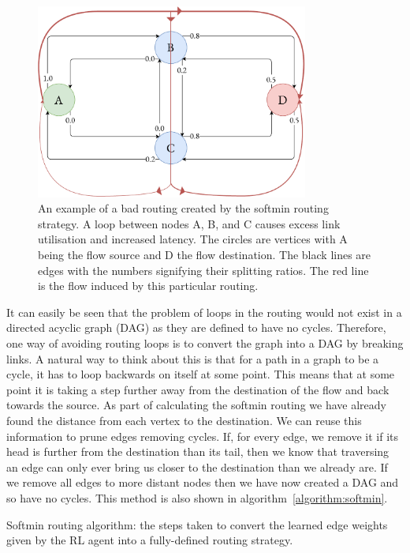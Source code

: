 \begin{figure}
    \centering
    \includegraphics[width=0.8\textwidth]{figures/bad_route.pdf}
    \caption{An example of a bad routing created by the softmin routing strategy. A loop between nodes A, B, and C causes excess link utilisation and increased latency. The circles are vertices with A being the flow source and D the flow destination. The black lines are edges with the numbers signifying their splitting ratios. The red line is the flow induced by this particular routing.}
    \label{fig:bad_route}
\end{figure}


It can easily be seen that the problem of loops in the routing would not exist in a directed acyclic graph (DAG) as they are defined to have no cycles. Therefore, one way of avoiding routing loops is to convert the graph into a DAG by breaking links. A natural way to think about this is that for a path in a graph to be a cycle, it has to loop backwards on itself at some point. This means that at some point it is taking a step further away from the destination of the flow and back towards the source. As part of calculating the softmin routing we have already found the distance from each vertex to the destination. We can reuse this information to prune edges removing cycles. If, for every edge, we remove it if its head is further from the destination than its tail, then we know that traversing an edge can only ever bring us closer to the destination than we already are. If we remove all edges to more distant nodes then we have now created a DAG and so have no cycles. This method is also shown in algorithm~\ref{algorithm:softmin}.

\begin{algorithm}[t]
\small
\begin{algorithmic}
\EndFunction
\end{algorithmic}
\caption{Softmin routing algorithm: the steps taken to convert the learned edge weights given by the RL agent into a fully-defined routing strategy.}
\label{algorithm:softmin}
\end{algorithm}

